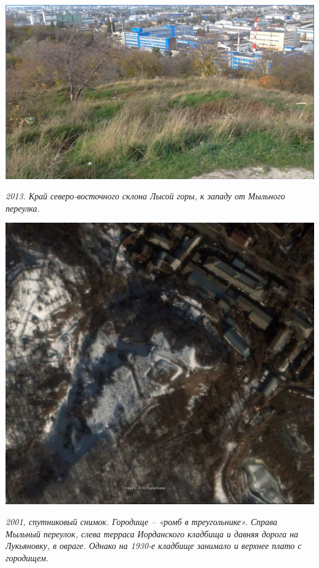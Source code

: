 \begin{center}
\includegraphics[width=\linewidth]{chast-kirvys/lys02/lg01.jpg}

\textit{2013. Край северо-восточного склона Лысой горы, к западу от Мыльного переулка.}
\end{center}
\vspace*{\fill}
\newpage

\newpage
\vspace*{\fill}
\begin{center}
\includegraphics[width=\linewidth]{chast-kirvys/lys02/romb.jpg}

\textit{2001, спутниковый снимок. Городище – «ромб в треугольнике». Справа Мыльный переулок, слева терраса Иорданского кладбища и давняя дорога на Лукьяновку, в овраге. Однако на 1930-е кладбище занимало и верхнее плато с городищем.}
\end{center}
\vspace*{\fill}

